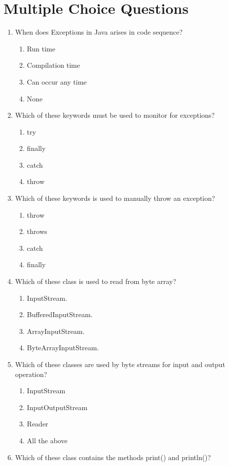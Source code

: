 \documentclass[11pt,a4paper]{article}
\begin{document}
\section*{Multiple Choice Questions}
\begin{enumerate}
\item When does Exceptions in Java arises in code sequence?
\begin{enumerate}
\item Run time
\item Compilation time
\item Can occur any time 
\item None
\end{enumerate}
\item Which of these keywords must be used to monitor for exceptions?
\begin{enumerate}
\item try
\item finally
\item catch
\item throw
\end{enumerate}
\item Which of these keywords is used to manually throw an exception?
\begin{enumerate}
\item throw
\item throws
\item catch
\item finally
\end{enumerate}
\item Which of these class is used to read from byte array?
\begin{enumerate}
\item InputStream.
\item BufferedInputStream.
\item ArrayInputStream.
\item ByteArrayInputStream.
\end{enumerate}
\item Which of these classes are used by byte streams for input and output operation?
\begin{enumerate}
\item InputStream
\item InputOutputStream
\item Reader
\item All the above
\end{enumerate}
\item Which of these class contains the methods print() and  println()?

\end{enumerate}
\end{document}
